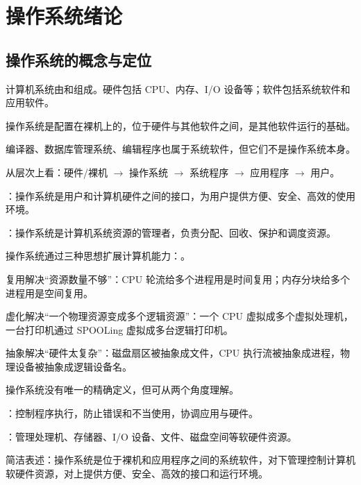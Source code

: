 \chapter{操作系统绪论}

\section{操作系统的概念与定位}
\begin{points}
  \item 计算机系统由和组成。硬件包括 CPU、内存、I/O 设备等；软件包括系统软件和应用软件。
  \item 操作系统是配置在裸机上的，位于硬件与其他软件之间，是其他软件运行的基础。
  \item 编译器、数据库管理系统、编辑程序也属于系统软件，但它们不是操作系统本身。
  \item 从层次上看：硬件/裸机 $\rightarrow$ 操作系统 $\rightarrow$ 系统程序 $\rightarrow$ 应用程序 $\rightarrow$ 用户。
\end{points}

\begin{points}
  \item {}：操作系统是用户和计算机硬件之间的接口，为用户提供方便、安全、高效的使用环境。
  \item {}：操作系统是计算机系统资源的管理者，负责分配、回收、保护和调度资源。
  \item 操作系统通过三种思想扩展计算机能力：。
  \item 复用解决“资源数量不够”：CPU 轮流给多个进程用是时间复用；内存分块给多个进程用是空间复用。
  \item 虚化解决“一个物理资源变成多个逻辑资源”：一个 CPU 虚拟成多个虚拟处理机，一台打印机通过 SPOOLing 虚拟成多台逻辑打印机。
  \item 抽象解决“硬件太复杂”：磁盘扇区被抽象成文件，CPU 执行流被抽象成进程，物理设备被抽象成逻辑设备名。
\end{points}


\begin{points}
  \item 操作系统没有唯一的精确定义，但可从两个角度理解。
  \item {}：控制程序执行，防止错误和不当使用，协调应用与硬件。
  \item {}：管理处理机、存储器、I/O 设备、文件、磁盘空间等软硬件资源。
  \item 简洁表述：操作系统是位于裸机和应用程序之间的系统软件，对下管理控制计算机软硬件资源，对上提供方便、安全、高效的接口和运行环境。
\end{points}


